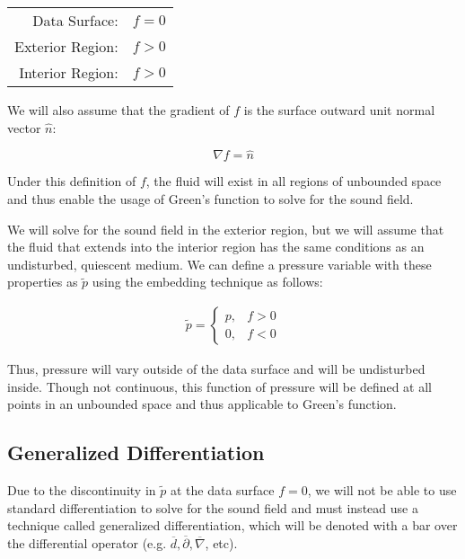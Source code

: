 \documentclass[]{aiaa-tc}%
\begin{document}
\begin{center}
\begin{tabular}{| r  l |}
  \hline
  Data Surface:    & $f=0$ \\
  Exterior Region: & $f>0$ \\
  Interior Region: & $f>0$ \\
  \hline
\end{tabular}
\end{center}

\noindent We will also assume that the gradient of $f$ is the surface outward unit normal vector $\hat{n}$:

\begin{equation} \label{Gradfnormal}
\nabla f = \hat{n}
\end{equation}

Under this definition of $f$, the fluid will exist in all regions of unbounded space and thus enable the usage of Green's function to solve for the sound field.

We will solve for the sound field in the exterior region, but we will assume that the fluid that extends into the interior region has the same conditions as an undisturbed, quiescent medium.  We can define a pressure variable with these properties as $\widetilde{p}$ using the embedding technique as follows:

\begin{equation} \label{Ptilde}
\begin{split}
\widetilde{p} =
    \left\{ \begin{array}{lll}
        p, & f > 0 \\
        0, & f < 0
    \end{array} \right.
\end{split}
\end{equation}

\noindent Thus, pressure will vary outside of the data surface and will be undisturbed inside. Though not continuous, this function of pressure will be defined at all points in an unbounded space and thus applicable to Green's function.




\subsection{Generalized Differentiation}

Due to the discontinuity in $\widetilde{p}$ at the data surface $f=0$, we will not be able to use standard differentiation to solve for the sound field and must instead use a technique called generalized differentiation, which will be denoted with a bar over the differential operator (e.g. $\overline{d}, \overline{\partial}, \overline{\nabla}$, etc).
\end{document}
